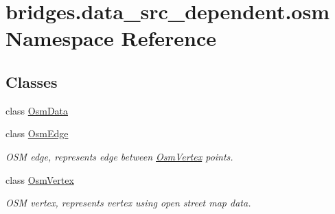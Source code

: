 \hypertarget{namespacebridges_1_1data__src__dependent_1_1osm}{}\section{bridges.\+data\+\_\+src\+\_\+dependent.\+osm Namespace Reference}
\label{namespacebridges_1_1data__src__dependent_1_1osm}
\subsection*{Classes}
\begin{DoxyCompactItemize}
\item 
class \mbox{\hyperlink{classbridges_1_1data__src__dependent_1_1osm_1_1_osm_data}{Osm\+Data}}
\item 
class \mbox{\hyperlink{classbridges_1_1data__src__dependent_1_1osm_1_1_osm_edge}{Osm\+Edge}}
\begin{DoxyCompactList}\small\item\em O\+SM edge, represents edge between \mbox{\hyperlink{classbridges_1_1data__src__dependent_1_1osm_1_1_osm_vertex}{Osm\+Vertex}} points. \end{DoxyCompactList}\item 
class \mbox{\hyperlink{classbridges_1_1data__src__dependent_1_1osm_1_1_osm_vertex}{Osm\+Vertex}}
\begin{DoxyCompactList}\small\item\em O\+SM vertex, represents vertex using open street map data. \end{DoxyCompactList}\end{DoxyCompactItemize}
